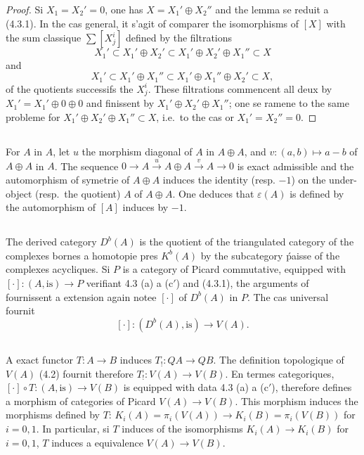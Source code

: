 \documentclass[12pt,a4paper]{article}
\theoremstyle{plain}
\theoremstyle{definition}
\begin{document}
\begin{proof}
Si $X_1 = X_2' = 0$, one has $X = X_1' \oplus X_2''$ and the lemma se reduit a (4.3.1).
In the cas general, it s'agit of comparer the isomorphisms of $[X]$ with the
sum classique $\sum [X_j^i]$ defined by the filtrations
\[
X_1' \subset X_1' \oplus X_2' \subset X_1' \oplus X_2' \oplus X_1'' \subset X
\]
and
\[
X_1' \subset X_1' \oplus X_1'' \subset X_1' \oplus X_1'' \oplus X_2' \subset X,
\]
of the quotients successifs the $X_j^i$. These filtrations commencent all deux by
$X_1' = X_1' \oplus 0 \oplus 0$ and finissent by $X_1' \oplus X_2' \oplus X_1''$; one se ramene to the same probleme for
$X_1' \oplus X_2' \oplus X_1'' \subset X$, i.e.\ to the cas or $X_1' = X_2'' = 0$.
\end{proof}

\subsection{}

For $A$ in $A$, let $u$ the morphism diagonal of $A$ in $A \oplus A$, and $v:
(a,b) \mapsto a - b$ of $A \oplus A$ in $A$. The sequence $0 \to A \xrightarrow{u} A \oplus A \xrightarrow{v} A \to 0$ is exact
admissible and the automorphism of symetrie of $A \oplus A$ induces the identity (resp.
$-1$) on the under-object (resp.\ the quotient) $A$ of $A \oplus A$. One deduces that
$\varepsilon(A)$ is defined by the automorphism of $[A]$ induces by $-1$.

\subsection{}

The derived category $D^b(A)$ is the quotient of the triangulated category
of the complexes bornes a homotopie pres $K^b(A)$ by the subcategory \'paisse of the
complexes acycliques. Si $P$ is a category of Picard commutative, equipped with
$[\cdot]: (A, \text{is}) \to P$ verifiant 4.3 (a) a (c$'$) and (4.3.1), the arguments of~\cite{10}
fournissent a extension again notee $[\cdot]$ of $D^b(A)$ in $P$. The cas universal
fournit
\[
[\cdot]: (D^b(A), \text{is}) \longrightarrow V(A) .
\]

\subsection{}

A exact functor $T: A \to B$ induces $T_!: QA \to QB$. The definition topologique
of $V(A)$ (4.2) fournit therefore $T_!: V(A) \to V(B)$. En termes categoriques, $[\cdot] \circ
T: (A, \text{is}) \to V(B)$ is equipped with data 4.3 (a) a (c$'$), therefore defines a morphism
of categories of Picard $V(A) \to V(B)$. This morphism induces the morphisms defined
by $T$: $K_i(A) = \pi_i(V(A)) \to K_i(B) = \pi_i(V(B))$ for $i = 0, 1$. In particular,
si $T$ induces of the isomorphisms $K_i(A) \to K_i(B)$ for $i = 0, 1$, $T$ induces a
equivalence $V(A) \to V(B)$.
\end{document}

